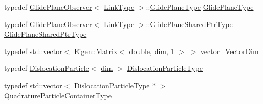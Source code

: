 \begin{DoxyCompactItemize}
\item 
typedef \hyperlink{structmodel_1_1_glide_plane_observer}{Glide\+Plane\+Observer}$<$ \hyperlink{_spline_node_base__corder0_8h_ab09ccc0af6ea9402dfef7b0eac55cff3}{Link\+Type} $>$\+::\hyperlink{classmodel_1_1_dislocation_segment_a1e6ed83f6325baa55fed3ad066e0f8d1}{Glide\+Plane\+Type} \hyperlink{classmodel_1_1_dislocation_segment_a1e6ed83f6325baa55fed3ad066e0f8d1}{Glide\+Plane\+Type}
\item 
typedef \hyperlink{structmodel_1_1_glide_plane_observer}{Glide\+Plane\+Observer}$<$ \hyperlink{_spline_node_base__corder0_8h_ab09ccc0af6ea9402dfef7b0eac55cff3}{Link\+Type} $>$\+::\hyperlink{classmodel_1_1_dislocation_segment_a0563390515c7e0e65c8f949e545b1fc6}{Glide\+Plane\+Shared\+Ptr\+Type} \hyperlink{classmodel_1_1_dislocation_segment_a0563390515c7e0e65c8f949e545b1fc6}{Glide\+Plane\+Shared\+Ptr\+Type}
\item 
typedef std\+::vector$<$ Eigen\+::\+Matrix$<$ double, \hyperlink{classmodel_1_1_dislocation_segment_a10a92a3e7fa3a34303d85bd00da0de02a026f372e58773b98ecc0b1e1db99a323}{dim}, 1 $>$ $>$ \hyperlink{classmodel_1_1_dislocation_segment_abc79dbe2a844d424d597677d88324502}{vector\+\_\+\+Vector\+Dim}
\item 
typedef \hyperlink{structmodel_1_1_dislocation_particle}{Dislocation\+Particle}$<$ \hyperlink{classmodel_1_1_dislocation_segment_a10a92a3e7fa3a34303d85bd00da0de02a026f372e58773b98ecc0b1e1db99a323}{dim} $>$ \hyperlink{classmodel_1_1_dislocation_segment_ae5ede42f748e4f51479ce6891135b5e1}{Dislocation\+Particle\+Type}
\item 
typedef std\+::vector$<$ \hyperlink{classmodel_1_1_dislocation_segment_ae5ede42f748e4f51479ce6891135b5e1}{Dislocation\+Particle\+Type} $\ast$ $>$ \hyperlink{classmodel_1_1_dislocation_segment_a86dd32b25521e4af71a4a8cb124abae4}{Quadrature\+Particle\+Container\+Type}
\end{DoxyCompactItemize}
